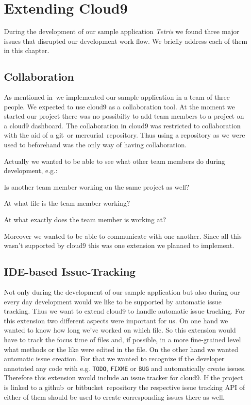 \section{Extending Cloud9}
\label{sec:Approaches}
During the development of our sample application \emph{Tetris} we found three major issues that disrupted our development work flow.
We briefly address each of them in this chapter.

\subsection{Collaboration}
As mentioned in~ we implemented our sample application in a team of three people.
We expected to use cloud9 as a collaboration tool.
At the moment we started our project there was no possibilty to add team members to a project on a cloud9 dashboard.
The collaboration in cloud9 was restricted to collaboration with the aid of a git~\needcite or mercurial~\needcite repository.
Thus using a repository as we were used to beforehand was the only way of having collaboration.

Actually we wanted to be able to see what other team members do during development, e.g.:
\begin{packed_itemize}
    \item Is another team member working on the same project as well?
    \item At what file is the team member working?
    \item At what exactly does the team member is working at?
\end{packed_itemize}
Moreover we wanted to be able to communicate with one another.
Since all this wasn't supported by cloud9 this was one extension we planned to implement.

\subsection{IDE-based Issue-Tracking}
Not only during the development of our sample application but also during our every day development would we like to be supported by automatic issue tracking.
Thus we want to extend cloud9 to handle automatic issue tracking.
For this extension two different aspects were important for us.
On one hand we wanted to know how long we've worked on which file.
So this extension would have to track the focus time of files and, if possible, in a more fine-grained level what methods or the like were edited in the file.
On the other hand we wanted automatic issue creation.
For that we wanted to recognize if the developer annotated any code with e.g. \texttt{TODO}, \texttt{FIXME} or \texttt{BUG} and automatically create issues.
Therefore this extension would include an issue tracker for cloud9.
If the project is linked to a github~\needcite or bitbucket~\needcite repository the respective issue tracking API of either of them should be used to create corresponding issues there as well.

